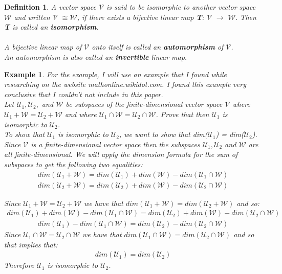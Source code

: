 \documentclass[12pt,a4paper]{article}
\newtheorem{defn}[thm]{Definition}
\newtheorem{exmp}{Example}[section]
\begin{document}
\begin{defn}
A vector space $\mathcal{V}$ is said to be isomorphic to another vector space $\mathcal{W}$ and written $\mathcal{V}$ ${\cong}$$\mathcal{W}$, if there exists a bijective linear map \textbf{T}:
$\mathcal{V}$ $\to$ $\mathcal{W}$. Then \textbf{T} is called an \textbf{isomorphism}. \\ \\A bijective linear map of $\mathcal{V}$ onto itself is called an \textbf{automorphism} of $\mathcal{V}$. \\An automorphism is also called an \textbf{invertible} linear map. 
\end{defn}
\begin{exmp}
For the example, I will use an example that I found while researching on the website mathonline.wikidot.com. I found this example very conclusive that I couldn't not include in this paper.\\
Let $\mathcal{U}_1, \mathcal{U}_2,$ and $\mathcal{W}$ be subspaces of the finite-dimensional vector space $\mathcal{V}$ where $\mathcal{U}_1 + \mathcal{W} = \mathcal{U}_2 + \mathcal{W}$ and where $\mathcal{U}_1 \cap \mathcal{W} = \mathcal{U}_2 \cap \mathcal{W}$. Prove that then $\mathcal{U}_1$ is isomorphic to $\mathcal{U}_2$.
\\
To show that $\mathcal{U}_1$ is isomorphic to $\mathcal{U}_2$, we want to show that dim($\mathcal{U}_1$) = dim($\mathcal{U}_2$).\\
Since $\mathcal{V}$ is a finite-dimensional vector space then the subspaces $\mathcal{U}_1, \mathcal{U}_2$ and $\mathcal{W}$ are all finite-dimensional. We will apply the dimension formula for the sum of subspaces to get the following two equalities:
\begin{align*}
dim(\mathcal{U}_1 + \mathcal{W}) = dim(\mathcal{U}_1) + dim(\mathcal{W}) - dim(\mathcal{U}_1 \cap \mathcal{W})
\end{align*}
\begin{align*}
dim(\mathcal{U}_2 + \mathcal{W}) = dim(\mathcal{U}_2) + dim(\mathcal{W}) - dim(\mathcal{U}_2 \cap \mathcal{W})
\end{align*}

Since $\mathcal{U}_1 + \mathcal{W} = \mathcal{U}_2 + \mathcal{W}$ we have that $dim(\mathcal{U}_1 + \mathcal{W}) = dim(\mathcal{U}_2 + \mathcal{W})$ and so:
\begin{align*}
dim(\mathcal{U}_1) + dim(\mathcal{W}) - dim(\mathcal{U}_1 \cap \mathcal{W}) = dim(\mathcal{U}_2) + dim(\mathcal{W}) - dim(\mathcal{U}_2 \cap \mathcal{W}) 
\end{align*}
\begin{align*}
dim(\mathcal{U}_1) - dim(\mathcal{U}_1 \cap \mathcal{W}) = dim(\mathcal{U}_2) - dim(\mathcal{U}_2 \cap \mathcal{W})
\end{align*}
Since $\mathcal{U}_1 \cap \mathcal{W} = \mathcal{U}_2 \cap \mathcal{W}$ we have that $dim(\mathcal{U}_1 \cap \mathcal{W}) = dim(\mathcal{U}_2 \cap \mathcal{W})$ and so that implies that:
\begin{align*}
dim(\mathcal{U}_1) = dim(\mathcal{U}_2)
\end{align*}
Therefore $\mathcal{U}_1$ is isomorphic to $\mathcal{U}_2$.
\end{exmp}
\end{document}
